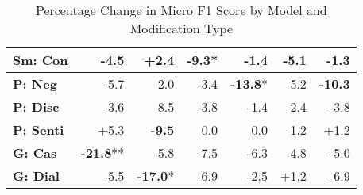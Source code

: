 \begin{table}[h]
\begin{tabular}{lrrrrrr}
\textbf{Sm: Con} & \cellcolor{red!13} -4.5 & \cellcolor{green!7} +2.4 & \cellcolor{red!27} \textbf{-9.3}* & \cellcolor{red!4} -1.4 & \cellcolor{red!15} -5.1 & \cellcolor{red!3} -1.3 \\
\hline
\textbf{P: Neg} & \cellcolor{red!17} -5.7 & \cellcolor{red!6} -2.0 & \cellcolor{red!10} -3.4 & \cellcolor{red!30} \textbf{-13.8}* & \cellcolor{red!15} -5.2 & \cellcolor{red!30} \textbf{-10.3} \\
\textbf{P: Disc} & \cellcolor{red!10} -3.6 & \cellcolor{red!25} -8.5 & \cellcolor{red!11} -3.8 & \cellcolor{red!4} -1.4 & \cellcolor{red!7} -2.4 & \cellcolor{red!11} -3.8 \\
\textbf{P: Senti} & \cellcolor{green!15} +5.3 & \cellcolor{red!28} \textbf{-9.5} & \cellcolor{red!0} 0.0 & \cellcolor{red!0} 0.0 & \cellcolor{red!3} -1.2 & \cellcolor{green!3} +1.2 \\
\hline
\textbf{G: Cas} & \cellcolor{red!30} \textbf{-21.8}** & \cellcolor{red!17} -5.8 & \cellcolor{red!22} -7.5 & \cellcolor{red!18} -6.3 & \cellcolor{red!14} -4.8 & \cellcolor{red!15} -5.0 \\
\textbf{G: Dial} & \cellcolor{red!16} -5.5 & \cellcolor{red!30} \textbf{-17.0}* & \cellcolor{red!20} -6.9 & \cellcolor{red!7} -2.5 & \cellcolor{green!3} +1.2 & \cellcolor{red!20} -6.9 \\
\hline
\end{tabular}
\caption{Percentage Change in Micro F1 Score by Model and Modification Type}
\label{tab:ner_results}
\end{table}